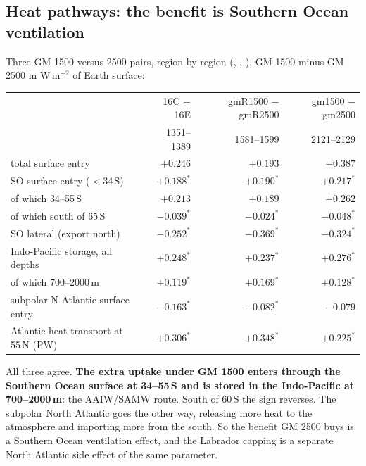 \documentclass[10pt]{article}
\begin{document}
\subsection{Heat pathways: the benefit is Southern Ocean ventilation}\label{sub:r43paths}

Three GM 1500 versus 2500 pairs, region by region (,
, ),
GM 1500 minus GM 2500 in W\,m$^{-2}$ of Earth surface:

\begin{center}\small
\begin{tabular}{lrrr}
\toprule
 & 16C $-$ 16E & gmR1500 $-$ gmR2500 & gm1500 $-$ gm2500 \\
 & 1351--1389 & 1581--1599 & 2121--2129 \\
\midrule
total surface entry                      & $+0.246$ & $+0.193$ & $+0.387$ \\
SO surface entry ($<$34\,S)              & $+0.188^*$ & $+0.190^*$ & $+0.217^*$ \\
\quad of which 34--55\,S                 & $+0.213$ & $+0.189$ & $+0.262$ \\
\quad of which south of 65\,S            & $-0.039^*$ & $-0.024^*$ & $-0.048^*$ \\
SO lateral (export north)                & $-0.252^*$ & $-0.369^*$ & $-0.324^*$ \\
Indo-Pacific storage, all depths         & $+0.248^*$ & $+0.237^*$ & $+0.276^*$ \\
\quad of which 700--2000\,m              & $+0.119^*$ & $+0.169^*$ & $+0.128^*$ \\
subpolar N Atlantic surface entry        & $-0.163^*$ & $-0.082^*$ & $-0.079$ \\
Atlantic heat transport at 55\,N (PW)    & $+0.306^*$ & $+0.348^*$ & $+0.225^*$ \\
\bottomrule
\end{tabular}
\end{center}

All three agree. \textbf{The extra uptake under GM 1500 enters through the Southern Ocean surface
at 34--55\,S and is stored in the Indo-Pacific at 700--2000\,m}: the AAIW/SAMW route. South of
60\,S the sign reverses. The subpolar North Atlantic goes the other way, releasing more heat to the
atmosphere and importing more from the south. So the benefit GM 2500 buys is a Southern Ocean
ventilation effect, and the Labrador capping is a separate North Atlantic side effect of the same
parameter.
\end{document}
